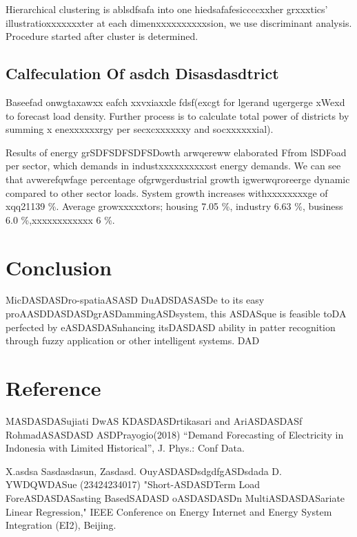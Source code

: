 \documentclass[conference]{IEEEtran}
\begin{document}
{%
Hierarchical clustering is ablsdfsafa into one hiedsafafesiccccxxher grxxxtics’ illustratioxxxxxxxter at each dimenxxxxxxxxxxsion, we use discriminant analysis. Procedure started after cluster is determined.

\subsection{Calfeculation Of asdch Disasdasdtrict}
Baseefad onwgtaxawxx eafch xxvxiaxxle fdsf(excgt for lgerand ugergerge xWexd to forecast load density. Further process is to calculate total power of districts by summing x enexxxxxxrgy per secxcxxxxxxy and socxxxxxxial). 
    
    
Results of energy grSDFSDFSDFSDowth arwqereww elaborated Ffrom lSDFoad per sector, which demands in industxxxxxxxxxxst energy demands.
We can see that avwerefqwfage percentage ofgrwgerdustrial growth igwerwqroreerge dynamic compared to other sector loads. System growth increases withxxxxxxxxge of xqq21139 \%. Average growxxxxxtors; housing 7.05 \%, industry 6.63 \%, business 6.0 \%,xxxxxxxxxxxx 6 \%.

\section{Conclusion}
MicDASDASDro-spatiaASASD
DuADSDASASDe to its easy proAASDDASDASDgrASDammingASDsystem, this ASDASque is feasible toDA perfected by eASDASDASnhancing itsDASDASD ability in patter recognition through fuzzy application or other intelligent systems.
DAD
\section*{Reference}
\noindent
[1]	MASDASDASujiati DwAS KDASDASDrtikasari and AriASDASDASf RohmadASASDASD ASDPrayogio(2018) “Demand Forecasting of Electricity in Indonesia with Limited Historical”, J. Phys.: Conf Data.

\noindent
[2]	X.asdsa Sasdasdasun, Zasdasd. OuyASDASDsdgdfgASDsdada D. YWDQWDASue (23424234017) "Short-ASDASDTerm Load ForeASDASDASasting BasedSADASD oASDASDASDn MultiASDASDASariate Linear Regression," IEEE Conference on Energy Internet and Energy System Integration (EI2), Beijing.

}
\end{document}
